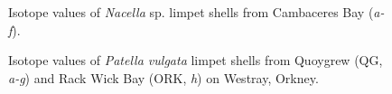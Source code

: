\documentclass[
  authoryear,
  preprint,
  3p]{elsarticle}
\begin{document}
\begin{figure}


\caption{\label{fig-Nac_iso}Isotope values of \emph{Nacella} sp. limpet
shells from Cambaceres Bay (\emph{a-f}).}

\end{figure}%

\begin{figure}


\caption{\label{fig-Pat_iso}Isotope values of \emph{Patella vulgata}
limpet shells from Quoygrew (QG, \emph{a-g}) and Rack Wick Bay (ORK,
\emph{h}) on Westray, Orkney.}

\end{figure}%
\end{document}
